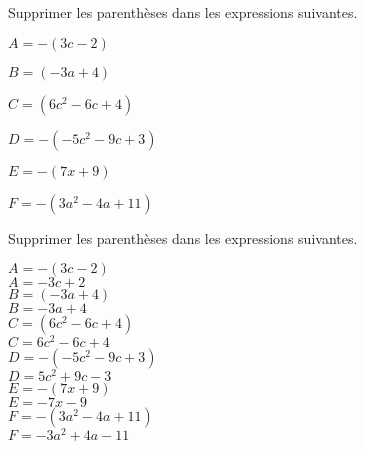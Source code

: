 \begin{exercice*}
    Supprimer les parenthèses dans les expressions suivantes.
    \begin{multicols}{2}
        \begin{itemize}
            \begin{spacing}{1.2}
                \item[] $A=-(3c-2)$
                \item[] $B=(-3a+4)$
                \item[] $C=(6c^2-6c+4)$
                \item[] $D=-(-5c^2-9c+3)$
                \item[] $E=-(7x+9)$
                \item[] $F=-(3a^2-4a+11)$
            \end{spacing}
        \end{itemize}
    \end{multicols}
\end{exercice*}
\begin{corrige}
    Supprimer les parenthèses dans les expressions suivantes.
    \begin{multicols}{2}
        \begin{itemize}
            \def\item{}
            \item $A=-(3c-2)$\\
            {\red $A=-3c+2$\\\smallskip}
            \item $B=(-3a+4)$\\
            {\red $B=-3a+4$\\\smallskip}
            \item $C=(6c^2-6c+4)$\\
            {\red $C=6c^2-6c+4$\\\smallskip}
            \item $D=-(-5c^2-9c+3)$\\
            {\red $D=5c^2+9c-3$\\\smallskip}
            \item $E=-(7x+9)$\\
            {\red $E=-7x-9$\\\smallskip}
            \item $F=-(3a^2-4a+11)$\\
            {\red $F=-3a^2+4a-11$}
        \end{itemize}
    \end{multicols}
\end{corrige}


